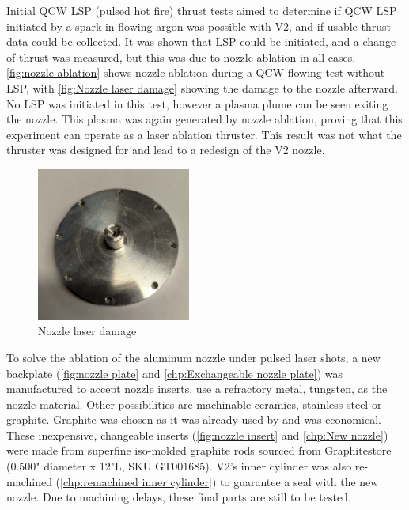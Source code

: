 Initial QCW LSP (pulsed hot fire) thrust tests aimed to determine if QCW LSP initiated by a spark in flowing argon was possible with V2, and if usable thrust data could be collected. It was shown that LSP could be initiated, and a change of thrust was measured, but this was due to nozzle ablation in all cases. \autoref{fig:nozzle ablation} shows nozzle ablation during a QCW flowing test without LSP, with \autoref{fig:Nozzle laser damage} showing the damage to the nozzle afterward. No LSP was initiated in this test, however a plasma plume can be seen exiting the nozzle. This plasma was again generated by nozzle ablation, proving that this experiment can operate as a laser ablation thruster. This result was not what the thruster was designed for and lead to a redesign of the V2 nozzle.

\begin{figure}[!ht]
    \centering
    \includegraphics[width=0.45\textwidth]{assets/4 experiments/Nozzle damage.jpg}
    \caption{Nozzle laser damage}
    \label{fig:Nozzle laser damage}
\end{figure}

To solve the ablation of the aluminum nozzle under pulsed laser shots, a new backplate (\autoref{fig:nozzle plate} and \autoref{chp:Exchangeable nozzle plate}) was manufactured to accept nozzle inserts. \textcite{toyodaThrustPerformanceCW2002} use a refractory metal, tungsten, as the nozzle material. Other possibilities are machinable ceramics, stainless steel or graphite. Graphite was chosen as it was already used by \textcite{shojiLaserheatedRocketThruster1977} and was economical. These inexpensive, changeable inserts (\autoref{fig:nozzle insert} and \autoref{chp:New nozzle}) were made from superfine iso-molded graphite rods sourced from Graphitestore (0.500" diameter x 12"L, SKU GT001685). V2's inner cylinder was also re-machined (\autoref{chp:remachined inner cylinder}) to guarantee a seal with the new nozzle. Due to machining delays, these final parts are still to be tested.

